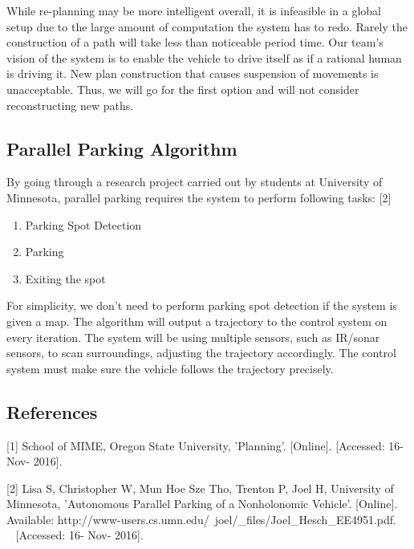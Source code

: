 \documentclass[compsoc,draftclsnofoot,onecolumn,10pt]{IEEEtran}
\begin{document}
While re-planning may be more intelligent overall, it is infeasible in a global 
setup due to the large amount of computation the system has to redo. Rarely the 
construction of a path will take less than noticeable period time. Our team's 
vision of the system is to enable the vehicle to drive itself as if a rational 
human is driving it. New plan construction that causes suspension of movements is 
unacceptable. Thus, we will go for the first option and will not consider 
reconstructing new paths.\par

\subsection{Parallel Parking Algorithm}
By going through a research project carried out by students at University of 
Minnesota, parallel parking requires the system to perform following tasks: [2]\par

\begin{enumerate}
\item Parking Spot Detection
\item Parking
\item Exiting the spot
\end{enumerate}

For simplicity, we don't need to perform parking spot detection if the system 
is given a map. The algorithm will output a trajectory to the control system on 
every iteration. The system will be using multiple sensors, such as IR/sonar 
sensors, to scan surroundings, adjusting the trajectory accordingly. The control 
system must make sure the vehicle follows the trajectory precisely.\par

\subsection{References}
[1] School of MIME, Oregon State University, 'Planning'. [Online].
[Accessed: 16- Nov- 2016].\par

[2] Lisa S, Christopher W, Mun Hoe Sze Tho, Trenton P, Joel H, University 
of Minnesota, 'Autonomous Parallel Parking of a Nonholonomic Vehicle'. [Online]. 
Available: http://www-users.cs.umn.edu/~joel/\_files/Joel\_Hesch\_EE4951.pdf.\\~ 
[Accessed: 16- Nov- 2016].\par
\end{document}
